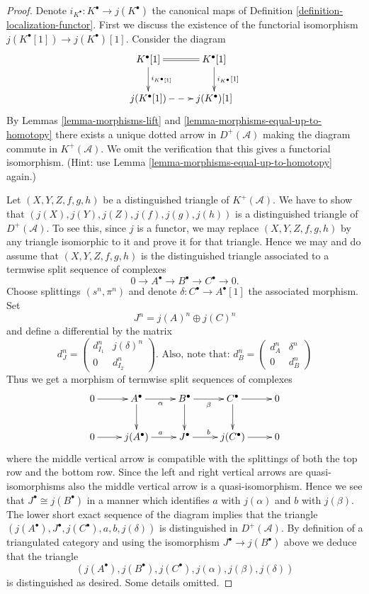 \begin{proof}
Denote $i_{K^\bullet} : K^\bullet \to j(K^\bullet)$ the
canonical maps of Definition \ref{definition-localization-functor}.
First we discuss the existence of the functorial isomorphism
$j(K^\bullet[1]) \to j(K^\bullet)[1]$.
Consider the diagram
$$
\xymatrix{
K^\bullet[1] \ar[d]^{i_{K^\bullet[1]}} \ar@{=}[r] &
K^\bullet[1] \ar[d]^{i_{K^\bullet}[1]} \\
j(K^\bullet[1]) \ar@{-->}[r] & j(K^\bullet)[1]
}
$$
By Lemmas \ref{lemma-morphisms-lift}
and \ref{lemma-morphisms-equal-up-to-homotopy}
there exists a unique dotted arrow in $D^{+}(\mathcal{A})$
making the diagram commute in $K^{+}(\mathcal{A})$.
We omit the verification that this gives a functorial isomorphism.
(Hint: use Lemma \ref{lemma-morphisms-equal-up-to-homotopy} again.)

\medskip\noindent
Let $(X, Y, Z, f, g, h)$ be a distinguished triangle of $K^{+}(\mathcal{A})$.
We have to show that $(j(X), j(Y), j(Z), j(f), j(g), j(h))$ is
a distinguished triangle of $D^{+}(\mathcal{A})$. To see this, since
$j$ is a functor, we may replace $(X, Y, Z, f, g, h)$ by any triangle
isomorphic to it and prove it for that triangle. Hence we may and do
assume that $(X, Y, Z, f, g, h)$ is the distinguished triangle
associated to a termwise split sequence of complexes
$$
0 \to A^\bullet \to B^\bullet \to C^\bullet \to 0.
$$
Choose splittings $(s^n, \pi^n)$ and denote
$\delta : C^\bullet \to A^\bullet[1]$ the associated
morphism. Set
$$
J^n = j(A)^n \oplus j(C)^n
$$
and define a differential by the matrix
$$
d_J^n =
\left(
\begin{matrix}
d_{I_1}^n & j(\delta)^n \\
0 & d_{I_2}^n
\end{matrix}
\right).
\text{ Also, note that: }
d_B^n =
\left(
\begin{matrix}
d_{A}^n & \delta^n \\
0 & d_{B}^n
\end{matrix}
\right)
$$
Thus we get a morphism of termwise split
sequences of complexes
$$
\xymatrix{
0 \ar[r] &
A^\bullet \ar[r]_\alpha \ar[d] &
B^\bullet \ar[r]_\beta \ar[d] &
C^\bullet \ar[r] \ar[d] &
0 \\
0 \ar[r] &
j(A^\bullet) \ar[r]^a &
J^\bullet \ar[r]^b &
j(C^\bullet) \ar[r] &
0
}
$$
where the middle vertical arrow is compatible with the
splittings of both the top row and the bottom row.
Since the left and right vertical arrows are quasi-isomorphisms
also the middle vertical arrow is a quasi-isomorphism.
Hence we see that $J^\bullet \cong j(B^\bullet)$ in a manner which
identifies $a$ with $j(\alpha)$
and $b$ with $j(\beta)$.
The lower short exact sequence of the diagram implies that the
triangle
$(j(A^\bullet), J^\bullet, j(C^\bullet), a, b, j(\delta))$
is distinguished in $D^{+}(\mathcal{A})$. By definition of
a triangulated category and using the isomorphism
$J^\bullet \to j(B^\bullet)$ above we deduce that
the triangle
$$
(j(A^\bullet), j(B^\bullet), j(C^\bullet), j(\alpha), j(\beta), j(\delta))
$$
is distinguished as desired. Some details omitted.
\end{proof}

